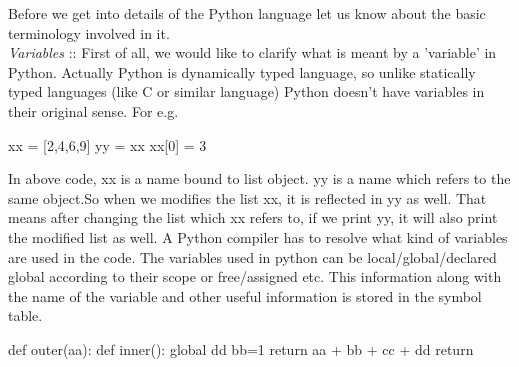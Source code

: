 Before we get into details of the Python language let us know about the basic terminology involved in it.
\\
\linebreak
\textit{Variables}	::	First of all, we would like to clarify what is meant by a 'variable' in Python. Actually Python is dynamically typed language, so unlike statically typed languages (like C or similar language) Python doesn't have variables in their original sense. For e.g.
\begin{code}

xx = [2,4,6,9]
yy = xx
xx[0] = 3
\end{code}

In above code, xx is a name bound to list object. yy is a name which refers to the same object.So when we modifies the list xx, it is reflected in yy as well. That means after changing the list which xx refers to, if we print yy, it will also print the modified list as well.
A Python compiler has to resolve what kind of variables are used in the code. The variables used in python can be local/global/declared global according to their scope or free/assigned etc. This information along with the name of the variable and other useful information is stored in the symbol table.

\begin{code}
def outer(aa):
	def inner():
		global dd
		bb=1
		return aa + bb + cc + dd
	return
\end{code}

